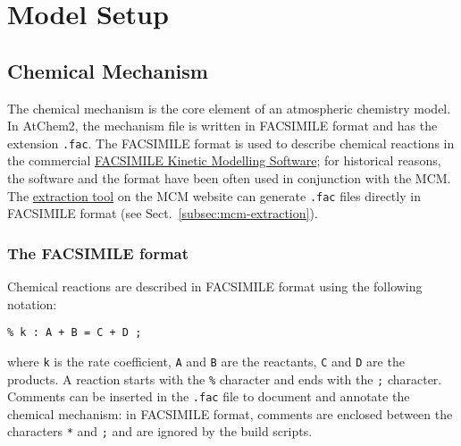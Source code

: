 %
%
%
%

\chapter{Model Setup} \label{ch:setup}

\section{Chemical Mechanism} \label{sec:chemical-mechanism}

The chemical mechanism is the core element of an atmospheric chemistry
model. In AtChem2, the mechanism file is written in FACSIMILE format
and has the extension \texttt{.fac}. The FACSIMILE format is used to
describe chemical reactions in the commercial
\href{http://www.mcpa-software.com/}{FACSIMILE Kinetic Modelling Software};
for historical reasons, the software and the format have been
often used in conjunction with the MCM. The
\href{http://mcm.leeds.ac.uk/MCM/extract.htt}{extraction tool} on the
MCM website can generate \texttt{.fac} files directly in FACSIMILE
format (see Sect.~\ref{subsec:mcm-extraction}).

\subsection{The FACSIMILE format} \label{subsec:facsimile-format}

Chemical reactions are described in FACSIMILE format using the
following notation:

\begin{verbatim}
% k : A + B = C + D ;
\end{verbatim}

where \texttt{k} is the rate coefficient, \texttt{A} and \texttt{B}
are the reactants, \texttt{C} and \texttt{D} are the products. A
reaction starts with the \texttt{\%} character and ends with the
\texttt{;} character. Comments can be inserted in the \texttt{.fac}
file to document and annotate the chemical mechanism: in FACSIMILE
format, comments are enclosed between the characters \texttt{*} and
\texttt{;} and are ignored by the build scripts.

